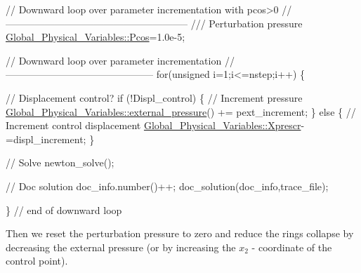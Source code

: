 \begin{DoxyCodeInclude}
 \textcolor{comment}{// Downward loop over parameter incrementation with pcos>0 }
 \textcolor{comment}{//--------------------------------------------------------}
 \textcolor{comment}{}
\textcolor{comment}{ /// Perturbation pressure}
\textcolor{comment}{} \hyperlink{namespaceGlobal__Physical__Variables_ab55734aaa66260cd9d4bf68a4ecafdd5}{Global\_Physical\_Variables::Pcos}=1.0e-5; 


 \textcolor{comment}{// Downward loop over parameter incrementation}
 \textcolor{comment}{//---------------------------------------------}
 \textcolor{keywordflow}{for}(\textcolor{keywordtype}{unsigned} i=1;i<=nstep;i++)
  \{
   
   \textcolor{comment}{// Displacement control?}
   \textcolor{keywordflow}{if} (!Displ\_control) 
    \{
     \textcolor{comment}{// Increment pressure}
     \hyperlink{namespaceGlobal__Physical__Variables_a8c25ac6a672ea50d1b709292d1f4837b}{Global\_Physical\_Variables::external\_pressure}() += 
      pext\_increment;
    \}
   \textcolor{keywordflow}{else}
    \{
     \textcolor{comment}{// Increment control displacement}
     \hyperlink{namespaceGlobal__Physical__Variables_a1c774c9cb221df909201e81e84b15f40}{Global\_Physical\_Variables::Xprescr}-=displ\_increment;
    \} 
   
   \textcolor{comment}{// Solve}
   newton\_solve();
   
   \textcolor{comment}{// Doc solution}
   doc\_info.number()++;
   doc\_solution(doc\_info,trace\_file);
   
  \} \textcolor{comment}{// end of downward loop}

\end{DoxyCodeInclude}


Then we reset the perturbation pressure to zero and reduce the ring\textquotesingle{}s collapse by decreasing the external pressure (or by increasing the $ x_2$ -\/ coordinate of the control point).


